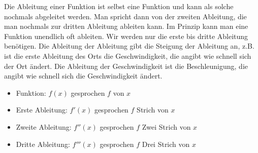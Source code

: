 Die Ableitung einer Funktion ist selbst eine Funktion und kann als solche nochmals abgeleitet werden. Man spricht dann von der zweiten Ableitung, die man nochmals zur dritten Ableitung ableiten kann. Im Prinzip kann man eine Funktion unendlich oft ableiten. Wir werden nur die erste bis dritte Ableitung benötigen. Die Ableitung der Ableitung gibt die Steigung der Ableitung an, z.B. ist die erste Ableitung des Orts die Geschwindigkeit, die angibt wie schnell sich der Ort ändert. Die Ableitung der Geschwindigkeit ist die Beschleunigung, die angibt wie schnell sich die Geschwindigkeit ändert.
\begin{itemize}
	\item Funktion: \textcolor{loes}{\(f(x)\) gesprochen \(f\) von \(x\)}

    \bigskip

	\item Erste Ableitung: \textcolor{loes}{\(f'(x)\) gesprochen \(f\) Strich von \(x\)}

    \bigskip

	\item Zweite Ableitung: \textcolor{loes}{\(f''(x)\) gesprochen \(f\) Zwei Strich von \(x\)}

    \bigskip

	\item Dritte Ableitung: \textcolor{loes}{\(f'''(x)\) gesprochen \(f\) Drei Strich von \(x\)}

    \bigskip

\end{itemize}

